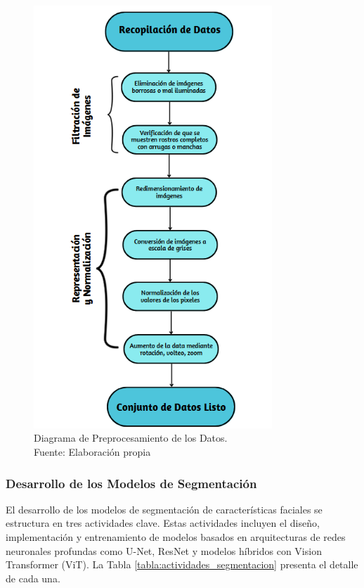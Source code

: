 \begin{figure}[h]
     \begin{center}
         \includegraphics[width=0.8\textwidth]{3/figures/Diagrama de preprocesamiento.png}
         \caption[Diagrama de Preprocesamiento de los Datos]{Diagrama de Preprocesamiento de los Datos.\\
         Fuente: Elaboración propia}
         \label{3:fig4}
     \end{center}
 \end{figure}


 \subsubsection{Desarrollo de los Modelos de Segmentación}
 El desarrollo de los modelos de segmentación de características faciales se estructura en tres actividades clave. Estas actividades incluyen el diseño, implementación y entrenamiento de modelos basados en arquitecturas de redes neuronales profundas como U-Net, ResNet y modelos híbridos con Vision Transformer (ViT). La Tabla \ref{tabla:actividades_segmentacion} presenta el detalle de cada una.

